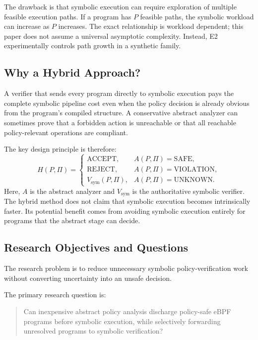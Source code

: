 \documentclass[12pt,a4paper]{article}
\begin{document}
The drawback is that symbolic execution can require exploration of multiple feasible execution paths. If a program has $P$ feasible paths, the symbolic workload can increase as $P$ increases. The exact relationship is workload dependent; this paper does not assume a universal asymptotic complexity. Instead, E2 experimentally controls path growth in a synthetic family.

\subsection{Why a Hybrid Approach?}

A verifier that sends every program directly to symbolic execution pays the complete symbolic pipeline cost even when the policy decision is already obvious from the program's compiled structure. A conservative abstract analyzer can sometimes prove that a forbidden action is unreachable or that all reachable policy-relevant operations are compliant.

The key design principle is therefore:
\begin{equation}
H(P,\Pi)=
\begin{cases}
\mathrm{ACCEPT}, & A(P,\Pi)=\mathrm{SAFE},\\
\mathrm{REJECT}, & A(P,\Pi)=\mathrm{VIOLATION},\\
V_{\mathrm{sym}}(P,\Pi), & A(P,\Pi)=\mathrm{UNKNOWN}.
\end{cases}
\end{equation}
Here, $A$ is the abstract analyzer and $V_{\mathrm{sym}}$ is the authoritative symbolic verifier. The hybrid method does not claim that symbolic execution becomes intrinsically faster. Its potential benefit comes from avoiding symbolic execution entirely for programs that the abstract stage can decide.

\subsection{Research Objectives and Questions}

The research problem is to reduce unnecessary symbolic policy-verification work without converting uncertainty into an unsafe decision.

The primary research question is:
\begin{quote}
Can inexpensive abstract policy analysis discharge policy-safe eBPF programs before symbolic execution, while selectively forwarding unresolved programs to symbolic verification?
\end{quote}
\end{document}
